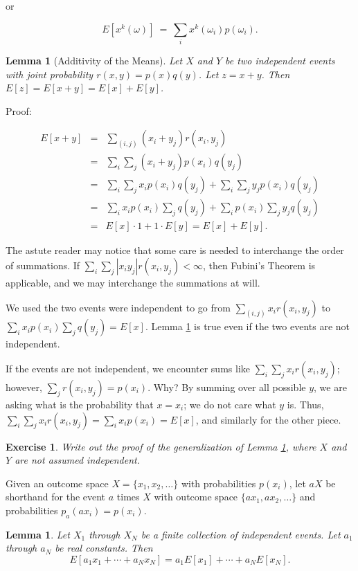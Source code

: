 \documentclass[12pt,letterpaper]{report}
\newcommand\be{\begin{equation}}
\newcommand\ee{\end{equation}}
\newcommand\bea{\begin{eqnarray}}
\newcommand\eea{\end{eqnarray}}
\newtheorem{lem}[thm]{Lemma}
\newtheorem{exe}[thm]{Exercise}
\begin{document}
or

\be E[x^k(\omega)] \ = \ \sum_i x^k(\omega_i) p(\omega_i). \ee


\begin{lem}[Additivity of the Means]\label{lemmeans} Let $X$ and $Y$ be two
independent events with joint probability $r(x,y) = p(x)q(y)$. Let
$z = x + y$. Then $E[z] = E[x+y] = E[x] + E[y]$.
\end{lem}

Proof:

\bea E[x+y] &=& \sum_{(i,j)} (x_i + y_j) r(x_i,y_j) \nonumber\\
&=& \sum_i \sum_j (x_i + y_j) p(x_i) q(y_j) \nonumber\\ &=& \sum_i
\sum_j x_i p(x_i) q(y_j) + \sum_i \sum_j y_j p(x_i) q(y_j)
\nonumber\\ &=&  \sum_i x_i p(x_i) \sum_j q(y_j) + \sum_i p(x_i)
\sum_j y_j q(y_j) \nonumber\\ &=& E[x] \cdot 1 + 1 \cdot E[y] =
E[x] + E[y]. \eea

The astute reader may notice that some care is needed to
interchange the order of summations. If $\sum_i \sum_j |x_i y_j|
r(x_i,y_j) < \infty$, then Fubini's Theorem is applicable, and we
may interchange the summations at will.

We used the two events were independent to go from $\sum_{(i,j)}
x_i r(x_i,y_j)$ to $\sum_i x_i p(x_i) \sum_j q(y_j) = E[x]$. Lemma
\ref{lemmeans} is true even if the two events are not independent.

If the events are not independent, we encounter sums like $\sum_i
\sum_j x_i r(x_i,y_j)$; however, $\sum_j r(x_i,y_j) = p(x_i)$.
Why? By summing over all possible $y$, we are asking what is the
probability that $x = x_i$; we do not care what $y$ is. Thus,
$\sum_i \sum_j x_i r(x_i,y_j) = \sum_i x_i p(x_i) = E[x]$, and
similarly for the other piece.

\begin{exe} Write out the proof of the generalization of Lemma
\ref{lemmeans}, where $X$ and $Y$ are not assumed independent.
\end{exe}

Given an outcome space $X = \{x_1, x_2, \dots \}$ with
probabilities $p(x_i)$, let $aX$ be shorthand for the event $a$
times $X$ with outcome space $\{ax_1, ax_2, \dots \}$ and
probabilities $p_a(ax_i) = p(x_i)$.

\begin{lem}\label{lemmeanofsum} Let $X_1$ through $X_N$ be a finite
collection of independent events. Let $a_1$ through $a_N$ be real
constants. Then \be E[a_1 x_1 + \cdots + a_N x_N] = a_1 E[x_1] +
\cdots + a_N E[x_N]. \ee
\end{lem}
\end{document}
